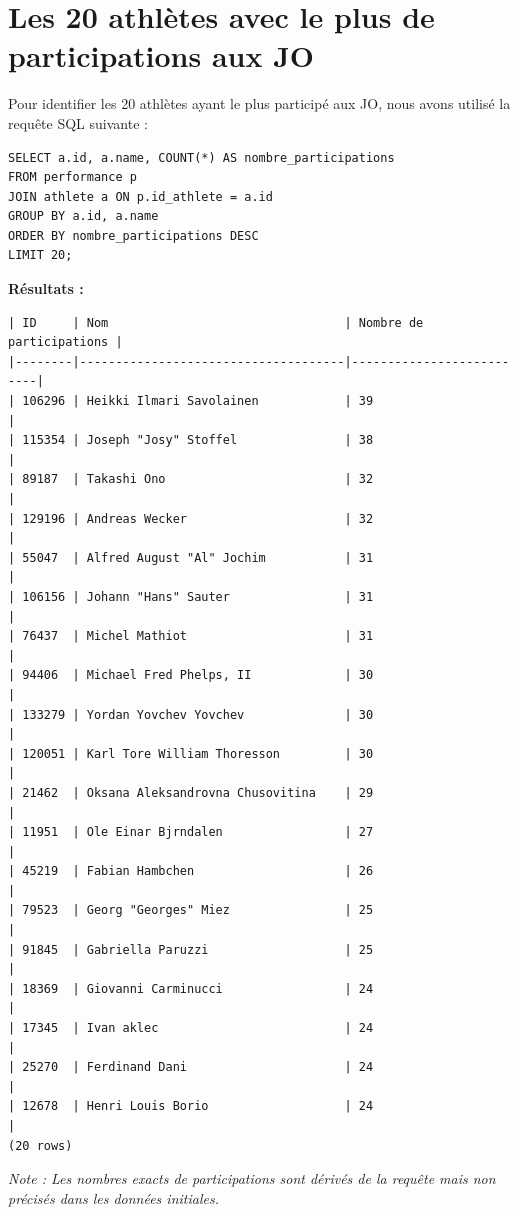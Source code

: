\documentclass[fontsize=10pt,oneside]{scrreprt}
\begin{document}
\chapter{Les 20 athlètes avec le plus de participations aux JO}
Pour identifier les 20 athlètes ayant le plus participé aux JO, nous avons utilisé la requête SQL suivante :
\begin{verbatim}
SELECT a.id, a.name, COUNT(*) AS nombre_participations
FROM performance p
JOIN athlete a ON p.id_athlete = a.id
GROUP BY a.id, a.name
ORDER BY nombre_participations DESC
LIMIT 20;
\end{verbatim}
\textbf{Résultats :}
\begin{verbatim}
| ID     | Nom                                 | Nombre de participations |
|--------|-------------------------------------|--------------------------|
| 106296 | Heikki Ilmari Savolainen            | 39                       |
| 115354 | Joseph "Josy" Stoffel               | 38                       |
| 89187  | Takashi Ono                         | 32                       |
| 129196 | Andreas Wecker                      | 32                       |
| 55047  | Alfred August "Al" Jochim           | 31                       |
| 106156 | Johann "Hans" Sauter                | 31                       |
| 76437  | Michel Mathiot                      | 31                       |
| 94406  | Michael Fred Phelps, II             | 30                       |
| 133279 | Yordan Yovchev Yovchev              | 30                       |
| 120051 | Karl Tore William Thoresson         | 30                       |
| 21462  | Oksana Aleksandrovna Chusovitina    | 29                       |
| 11951  | Ole Einar Bjrndalen                 | 27                       |
| 45219  | Fabian Hambchen                     | 26                       |
| 79523  | Georg "Georges" Miez                | 25                       |
| 91845  | Gabriella Paruzzi                   | 25                       |
| 18369  | Giovanni Carminucci                 | 24                       |
| 17345  | Ivan aklec                          | 24                       |
| 25270  | Ferdinand Dani                      | 24                       |
| 12678  | Henri Louis Borio                   | 24                       |
(20 rows)
\end{verbatim}
\emph{Note : Les nombres exacts de participations sont dérivés de la requête mais non précisés dans les données initiales.}
\end{document}
